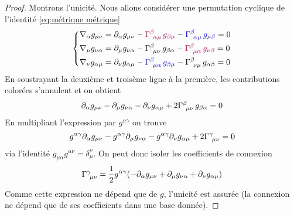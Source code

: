 \begin{proof}
    Montrons l'unicité. Nous allons considérer une permutation cyclique de l'identité \ref{eq:métrique métrique}
    \begin{equation}
        \begin{dcases}
            \nabla_{\alpha}g_{\mu \nu} = \partial_{\alpha}g_{\mu \nu} - \textcolor{purple}{\Gamma\indices{^{\beta}_{\!\alpha \mu}}\,g_{\beta \mu}} - \textcolor{blue}{\Gamma\indices{^{\beta}_{\!\alpha \mu}}\,g_{\mu \beta}} = 0 \\
            \nabla_{\mu}g_{ \nu \alpha } = \partial_{\mu}g_{\nu \alpha} - \Gamma\indices{^{\beta}_{\!\mu \nu}}\,g_{\beta \alpha} - \textcolor{purple}{\Gamma\indices{^{\beta}_{\!\mu \alpha}}\,g_{\nu \beta}} = 0 \\
            \nabla_{\nu}g_{ \alpha \mu } = \partial_{\nu}g_{\alpha \mu} - \textcolor{blue}{\Gamma\indices{^{\beta}_{\!\mu \alpha}}\,g_{\beta \mu}} - \Gamma\indices{^{\beta}_{\!\nu \mu}}\,g_{\alpha \beta} = 0 
        \end{dcases}
    \end{equation}
    En soustrayant la deuxième et troisème ligne à la première, les contributions colorées s'annulent et on obtient
    \begin{equation}
        \partial_{\alpha}g_{\mu \nu} - \partial_{\mu}g_{\nu \alpha} - \partial_{\nu}g_{\alpha \mu} +2\Gamma\indices{^{\beta}_{\!\mu \nu}}\, g_{\beta \alpha} = 0
    \end{equation}
    En multipliant l'expression par $g^{\alpha\gamma}$ on trouve 
    \begin{equation}
        g^{\alpha \gamma}\partial_{\alpha}g_{\mu \nu} - g^{\alpha \gamma}\partial_{\mu}g_{\nu \alpha} - g^{\alpha \gamma}\partial_{\nu}g_{\alpha \mu} +2\Gamma\indices{^{\gamma}_{\!\mu \nu}}  =0
    \end{equation}
    via l'identité $g_{\mu\alpha} g^{\alpha\nu} = \delta_\mu^\nu$. On peut donc isoler les coefficients de connexion
    \begin{equation}
        \Gamma\indices{^{\gamma}_{\!\mu \nu}} = \frac{1}{2}g^{\alpha \gamma}( - \partial_{\alpha}g_{\mu \nu} + \partial_{\mu}g_{\nu \alpha} + \partial_{\nu}g_{\alpha \mu})
    \end{equation}
    Comme cette expression ne dépend que de $g$, l'unicité est assurée (la connexion ne dépend que de ses coefficients dans une base donnée).
\end{proof}
